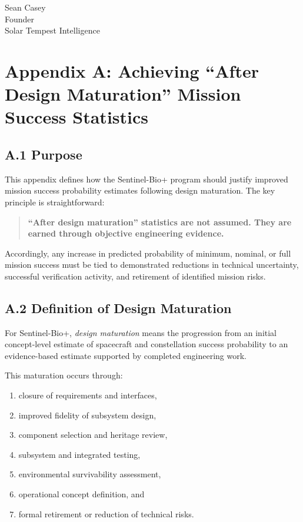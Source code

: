 \documentclass[11pt]{article}
\begin{document}
\noindent
Sean Casey\\
Founder\\
Solar Tempest Intelligence

\appendix
\section*{Appendix A: Achieving ``After Design Maturation'' Mission Success Statistics}

\subsection*{A.1 Purpose}

This appendix defines how the Sentinel-Bio+ program should justify improved mission success
probability estimates following design maturation. The key principle is straightforward:

\begin{quote}
\textbf{``After design maturation'' statistics are not assumed. They are earned through objective
engineering evidence.}
\end{quote}

Accordingly, any increase in predicted probability of minimum, nominal, or full mission success
must be tied to demonstrated reductions in technical uncertainty, successful verification activity,
and retirement of identified mission risks.

\subsection*{A.2 Definition of Design Maturation}

For Sentinel-Bio+, \emph{design maturation} means the progression from an initial concept-level
estimate of spacecraft and constellation success probability to an evidence-based estimate supported
by completed engineering work.

This maturation occurs through:

\begin{enumerate}
    \item closure of requirements and interfaces,
    \item improved fidelity of subsystem design,
    \item component selection and heritage review,
    \item subsystem and integrated testing,
    \item environmental survivability assessment,
    \item operational concept definition, and
    \item formal retirement or reduction of technical risks.
\end{enumerate}
\end{document}
